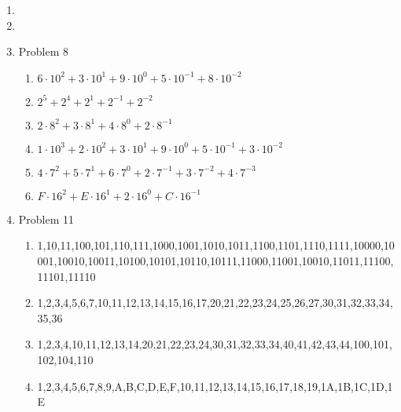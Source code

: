 \begin{enumerate}[leftmargin=2cm,labelsep=.5cm,label=\bf\arabic*.]
\item

\item

\item Problem 8
\begin{enumerate}
  \item $6 \cdot 10^2 + 3 \cdot 10^1 + 9 \cdot 10^0 + 5 \cdot 10^{-1} + 8 \cdot 10^{-2}$
  \item $2^5 + 2^4 + 2^1 + 2^{-1} + 2^{-2}$
  \item $2 \cdot 8^2 + 3 \cdot 8^1 + 4 \cdot 8^0 + 2 \cdot 8^{-1}$
  \item $1 \cdot 10^3 + 2 \cdot 10^2 + 3 \cdot 10^1 + 9 \cdot 10^0 + 5 \cdot 10^{-1} + 3 \cdot 10^{-2}$
  \item $4 \cdot 7^2 + 5 \cdot 7^1 + 6 \cdot 7^0 + 2 \cdot 7^{-1} + 3 \cdot 7^{-2} + 4 \cdot 7^{-3}$
  \item $F \cdot 16^2 + E \cdot 16^1 + 2 \cdot 16^0 + C \cdot 16^{-1}$\\[1cm]
\end{enumerate}

\item Problem 11
\begin{enumerate}
  \item 1,10,11,100,101,110,111,1000,1001,1010,1011,1100,1101,1110,1111,10000,10001,10010,10011,10100,10101,10110,10111,11000,11001,10010,11011,11100,11101,11110
  \item 1,2,3,4,5,6,7,10,11,12,13,14,15,16,17,20,21,22,23,24,25,26,27,30,31,32,33,34,35,36
  \item 1,2,3,4,10,11,12,13,14,20,21,22,23,24,30,31,32,33,34,40,41,42,43,44,100,101,102,104,110
  \item 1,2,3,4,5,6,7,8,9,A,B,C,D,E,F,10,11,12,13,14,15,16,17,18,19,1A,1B,1C,1D,1E
\end{enumerate}


\end{enumerate}

